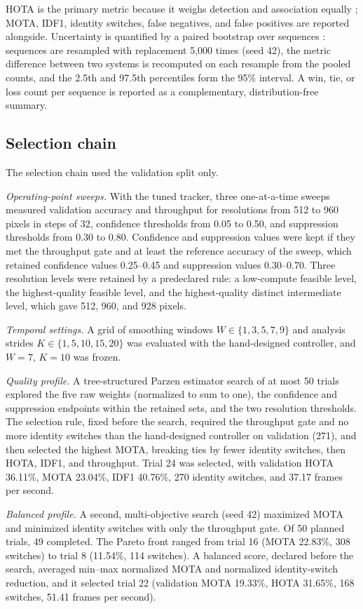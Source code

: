 \documentclass[journal]{new-aiaa}
\begin{document}
HOTA is the primary metric because it weighs detection and association equally \cite{luiten2021hota}; MOTA, IDF1, identity switches, false negatives, and false positives are reported alongside. Uncertainty is quantified by a paired bootstrap over sequences \cite{efron1993bootstrap}: sequences are resampled with replacement 5,000 times (seed 42), the metric difference between two systems is recomputed on each resample from the pooled counts, and the 2.5th and 97.5th percentiles form the 95\% interval. A win, tie, or loss count per sequence is reported as a complementary, distribution-free summary.

\subsection{Selection chain}
The selection chain used the validation split only.

\emph{Operating-point sweeps.} With the tuned tracker, three one-at-a-time sweeps measured validation accuracy and throughput for resolutions from 512 to 960 pixels in steps of 32, confidence thresholds from 0.05 to 0.50, and suppression thresholds from 0.30 to 0.80. Confidence and suppression values were kept if they met the throughput gate and at least the reference accuracy of the sweep, which retained confidence values 0.25--0.45 and suppression values 0.30--0.70. Three resolution levels were retained by a predeclared rule: a low-compute feasible level, the highest-quality feasible level, and the highest-quality distinct intermediate level, which gave 512, 960, and 928 pixels.

\emph{Temporal settings.} A grid of smoothing windows $W\in\{1,3,5,7,9\}$ and analysis strides $K\in\{1,5,10,15,20\}$ was evaluated with the hand-designed controller, and $W=7$, $K=10$ was frozen.

\emph{Quality profile.} A tree-structured Parzen estimator search of at most 50 trials explored the five raw weights (normalized to sum to one), the confidence and suppression endpoints within the retained sets, and the two resolution thresholds. The selection rule, fixed before the search, required the throughput gate and no more identity switches than the hand-designed controller on validation (271), and then selected the highest MOTA, breaking ties by fewer identity switches, then HOTA, IDF1, and throughput. Trial 24 was selected, with validation HOTA 36.11\%, MOTA 23.04\%, IDF1 40.76\%, 270 identity switches, and 37.17 frames per second.

\emph{Balanced profile.} A second, multi-objective search (seed 42) maximized MOTA and minimized identity switches with only the throughput gate. Of 50 planned trials, 49 completed. The Pareto front ranged from trial 16 (MOTA 22.83\%, 308 switches) to trial 8 (11.54\%, 114 switches). A balanced score, declared before the search, averaged min--max normalized MOTA and normalized identity-switch reduction, and it selected trial 22 (validation MOTA 19.33\%, HOTA 31.65\%, 168 switches, 51.41 frames per second).
\end{document}
